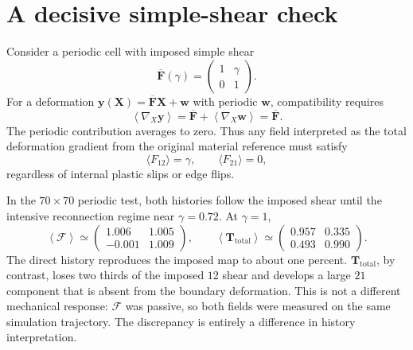 \documentclass[10pt,a4paper]{article}
\newcommand{\Fm}{\boldsymbol{\mathcal F}}
\newcommand{\F}{\mathbf F}
\newcommand{\Ttotal}{\mathbf T_{\mathrm{total}}}
\begin{document}
\section{A decisive simple-shear check}

Consider a periodic cell with imposed simple shear
\begin{equation}
  \overline{\F}(\gamma)=
  \begin{pmatrix}1&\gamma\\0&1\end{pmatrix}.
\end{equation}
For a deformation $\mathbf y(\mathbf X)=\overline{\F}\mathbf X+\mathbf w$
with periodic $\mathbf w$, compatibility requires
\begin{equation}
  \left\langle\nabla_{\!X}\mathbf y\right\rangle
  =\overline{\F}+\left\langle\nabla_{\!X}\mathbf w\right\rangle
  =\overline{\F}.
  \label{eq:macro-compatibility}
\end{equation}
The periodic contribution averages to zero.  Thus any field interpreted as the
total deformation gradient from the original material reference must satisfy
\begin{equation}
  \langle F_{12}\rangle=\gamma,
  \qquad
  \langle F_{21}\rangle=0,
\end{equation}
regardless of internal plastic slips or edge flips.

In the $70\times70$ periodic test, both histories follow the imposed shear until
the intensive reconnection regime near $\gamma=0.72$.  At $\gamma=1$,
\begin{equation}
 \left\langle\Fm\right\rangle
 \simeq
 \begin{pmatrix}1.006&1.005\\-0.001&1.009\end{pmatrix},
 \qquad
 \left\langle\Ttotal\right\rangle
 \simeq
 \begin{pmatrix}0.957&0.335\\0.493&0.990\end{pmatrix}.
 \label{eq:final-means}
\end{equation}
The direct history reproduces the imposed map to about one percent.
$\Ttotal$, by contrast, loses two thirds of the imposed $12$ shear and develops
a large $21$ component that is absent from the boundary deformation.  This is
not a different mechanical response: $\Fm$ was passive, so both fields were
measured on the same simulation trajectory.  The discrepancy is entirely a
difference in history interpretation.
\end{document}
